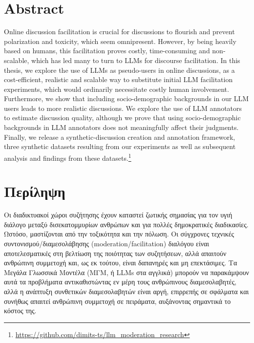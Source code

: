 %

\let\cleardoublepage\clearpage

\chapter*{Abstract}
\label{sec:abstract}

Online discussion facilitation is crucial for discussions to flourish and prevent polarization and toxicity, which seem omnipresent. However, by being heavily based on humans, this facilitation proves costly, time-consuming and non-scalable, which has led many to turn to LLMs for discourse facilitation. In this thesis, we explore the use of LLMs as pseudo-users in online discussions, as a cost-efficient, realistic and scalable way to substitute initial LLM facilitation experiments, which would ordinarily necessitate costly human involvement. Furthermore, we show that including socio-demographic backgrounds in our LLM users leads to more realistic discussions. We explore the use of LLM annotators to estimate discussion quality, although we prove that using socio-demographic backgrounds in LLM annotators does not meaningfully affect their judgments. Finally, we release a synthetic-discussion creation and annotation framework, three synthetic datasets resulting from our experiments as well as subsequent analysis and findings from these datasets.\footnote{\url{https://github.com/dimits-ts/llm_moderation_research}}

\chapter*{Περίληψη}
\label{sec:abstract_greek}


Οι διαδικτυακοί χώροι συζήτησης έχουν καταστεί ζωτικής σημασίας για τον υγιή διάλογο μεταξύ δισεκατομμυρίων ανθρώπων και για πολλές δημοκρατικές διαδικασίες. Ωστόσο, μαστίζονται από την τοξικότητα και την πόλωση. Οι σύγχρονες τεχνικές συντονισμού/διαμεσολάβησης (moderation/facilitation) διαλόγου είναι αποτελεσματικές στη βελτίωση της ποιότητας των συζητήσεων, αλλά απαιτούν ανθρώπινη συμμετοχή και, ως εκ τούτου, είναι δαπανηρές και μη επεκτάσιμες. Τα Μεγάλα Γλωσσικά Μοντέλα (ΜΓΜ, ή LLMs στα αγγλικά) μπορούν να παρακάμψουν αυτά τα προβλήματα αντικαθιστώντας εν μέρη τους ανθρώπινους διαμεσολαβητές, αλλά η ανάπτυξη συνθετικών διαμεσολαβητών είναι αργή, επιρρεπής σε σφάλματα και συνήθως απαιτεί ανθρώπινη συμμετοχή σε πειράματα, αυξάνοντας σημαντικά το κόστος της. 

